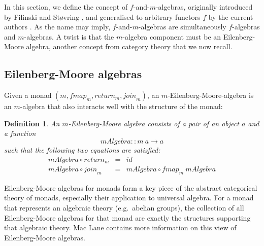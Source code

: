 \documentclass{jfp1}
\newtheorem{definition}{Definition}
\begin{document}
In this section, we define the concept of $f$-and-$m$-algebras,
originally introduced by Filinski and St\o{}vring
\cite{filinski07inductive}, and generalised to arbitrary functors $f$
by the current authors \cite{atkey12fibrational}. As the name may
imply, $f$-and-$m$-algebras are simultaneously $f$-algebras and
$m$-algebras. A twist is that the $m$-algebra component must be an
Eilenberg-Moore algebra, another concept from category theory that we
now recall.

\subsection{Eilenberg-Moore algebras}
\label{sec:eilenberg-moore-algebras}

Given a monad $(m, \mathit{fmap}_m, \mathit{return}_m,
\mathit{join}_m)$, an $m$-Eilenberg-Moore-algebra is an $m$-algebra
that also interacts well with the structure of the monad:

\begin{definition}
  An $m$-Eilenberg-Moore algebra consists of a pair of an object $a$
  and a function
  \begin{displaymath}
    \mathit{mAlgebra} :: m~a \to a
  \end{displaymath}
  such that the following two equations are satisfied:
  \begin{displaymath}
    \begin{array}{rcl}
      \mathit{mAlgebra} \circ \mathit{return}_m & = & \mathit{id} \\
      \mathit{mAlgebra} \circ \mathit{join}_m & = & \mathit{mAlgebra} \circ \mathit{fmap}_m~\mathit{mAlgebra} 
    \end{array}
  \end{displaymath}
\end{definition}

Eilenberg-Moore algebras for monads form a key piece of the abstract
categorical theory of monads, especially their application to
universal algebra. For a monad that represents an algebraic theory
(e.g.~abelian groups), the collection of all Eilenberg-Moore algebras
for that monad are exactly the structures supporting that algebraic
theory. Mac Lane \cite{maclane98} contains more information on this
view of Eilenberg-Moore algebras.
\end{document}
